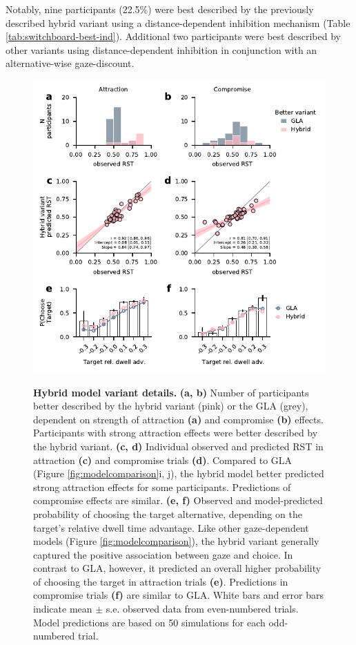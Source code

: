 \documentclass[11pt, a4paper]{article}
\begin{document}
Notably, nine participants (22.5\%) were best described by the previously described hybrid variant using a distance-dependent inhibition mechanism (Table \ref{tab:switchboard-best-ind}). Additional two participants were best described by other variants using distance-dependent inhibition in conjunction with an alternative-wise gaze-discount.

\begin{figure}
\caption{\textbf{Hybrid model variant details.} \textbf{(a, b)} Number of participants better described by the hybrid variant (pink) or the GLA (grey), dependent on strength of attraction \textbf{(a)} and compromise \textbf{(b)} effects. Participants with strong attraction effects were better described by the hybrid variant. \textbf{(c, d)} Individual observed and predicted RST in attraction \textbf{(c)} and compromise trials \textbf{(d)}. Compared to GLA (Figure \ref{fig:modelcomparison}i, j), the hybrid model better predicted strong attraction effects for some participants. Predictions of compromise effects are similar. \textbf{(e, f)} Observed and model-predicted probability of choosing the target alternative, depending on the target’s relative dwell time advantage. Like other gaze-dependent models (Figure \ref{fig:modelcomparison}), the hybrid variant generally captured the positive association between gaze and choice. In contrast to GLA, however, it predicted an overall higher probability of choosing the target in attraction trials \textbf{(e)}. Predictions in compromise trials \textbf{(f)} are similar to GLA. White bars and error bars indicate mean $\pm$ s.e. observed data from even-numbered trials. Model predictions are based on 50 simulations for each odd-numbered trial.}
\includegraphics[scale=1]{../figures/5-hybrid-variant.pdf}
\label{fig:hybrid}
\end{figure}
\end{document}
